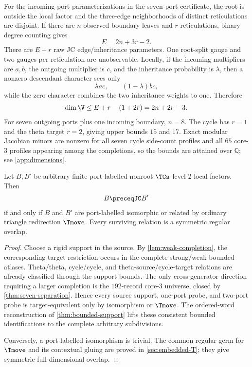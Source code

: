 For the incoming-port parameterizations in the seven-port certificate, the root is outside the local factor and the three-edge neighborhoods of distinct reticulations are disjoint.  If there are $n$ observed boundary leaves and $r$ reticulations, binary degree counting gives
\begin{equation}\label{eq:edge-count}
E=2n+3r-2.
\end{equation}
There are $E+r$ raw JC edge/inheritance parameters.  One root-split gauge and two gauges per reticulation are unobservable.  Locally, if the incoming multipliers are $a,b$, the outgoing multiplier is $c$, and the inheritance probability is $\lambda$, then a nonzero descendant character sees only
\[
\lambda ac,
\qquad
(1-\lambda)bc,
\]
while the zero character combines the two inheritance weights to one.  Therefore
\begin{equation}\label{eq:dimension-upper}
\dim \V\le E+r-(1+2r)=2n+2r-3.
\end{equation}
For seven outgoing ports plus one incoming boundary, $n=8$.  The cycle has $r=1$ and the theta target $r=2$, giving upper bounds $15$ and $17$.  Exact modular Jacobian minors are nonzero for all seven cycle side-count profiles and all $65$ core-3 profiles appearing among the completions, so the bounds are attained over $\mathbb Q$; see \cref{app:dimensions}.

\begin{theorem}\label{thm:nonroot-local}
Let $B,B'$ be arbitrary finite port-labelled nonroot $\TCs$ level-2 local factors.  Then
\[
B\preceqJC B'
\]
if and only if $B$ and $B'$ are port-labelled isomorphic or related by ordinary triangle redirection $\Tmove$.  Every surviving relation is a symmetric regular overlap.
\end{theorem}

\begin{proof}
Choose a rigid support in the source.  By \cref{lem:weak-completion}, the corresponding target restriction occurs in the complete strong/weak bounded atlases.  Theta/theta, cycle/cycle, and theta-source/cycle-target relations are already classified through the support bounds.  The only cross-generator direction requiring a larger completion is the $192$-record core-3 universe, closed by \cref{thm:seven-separation}.  Hence every source support, one-port probe, and two-port probe is target-equivalent only by isomorphism or $\Tmove$.  The ordered-word reconstruction of \cref{thm:bounded-support} lifts these consistent bounded identifications to the complete arbitrary subdivisions.

Conversely, a port-labelled isomorphism is trivial.  The common regular germ for $\Tmove$ and its contextual gluing are proved in \cref{sec:embedded-T}; they give symmetric full-dimensional overlap.
\end{proof}
